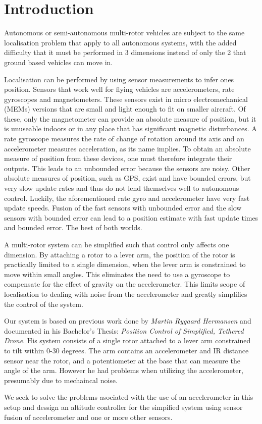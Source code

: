 \section*{Introduction}

Autonomous or semi-autonomous multi-rotor vehicles are subject to the 
same localisation problem that apply to all autonomous systems, with the added
difficulty that it must be performed in 3 dimensions instead of only 
the 2 that ground based vehicles can move in. 

Localisation can be performed by using sensor measurements to infer
ones position. Sensors that work well for flying vehicles are accelerometers,
rate gyroscopes and magnetometers. These sensors exist in micro electromechanical
(MEMs) versions that are small and light enough to fit on smaller aircraft.
Of these, only the magnetometer can provide
an absolute measure of position, but it is unuseable indoors or in any place
that has significant magnetic disturbances. A rate gyroscope measures the
rate of change of rotation around its axis and an accelerometer measures
acceleration, as its name implies. To obtain an absolute measure of position
from these devices, one must therefore integrate their outputs. This leads
to an unbounded error because the sensors are noisy. Other absolute measures 
of position, such as GPS, exist and have bounded errors, but very slow update
rates and thus do not lend themselves well to autonomous control. Luckily,
the aforementioned rate gyro and accelerometer have very fast update speeds.
Fusion of the fast sensors with unbounded error and the slow sensors with bounded
error can lead to a position estimate with fast update times and bounded error.
The best of both worlds.

A multi-rotor system can be simplified such that control only affects one dimension.
By attaching a rotor to a lever arm, the position of the rotor is practically limited
to a single dimension, when the lever arm is constrained to move within small angles.
This eliminates the need to use a gyroscope to compensate for the effect of gravity
on the accelerometer. This limits scope of localisation to dealing with noise
from the accelerometer and greatly simplifies the control of the system.

Our system is based on previous work done by \emph{Martin Rygaard Hermansen} and documented in his Bachelor's Thesis: \emph{Position Control of Simplified, Tethered Drone}. His system consists of a single rotor attached
to a lever arm constrained to tilt within 0-30 degrees. The arm contains an accelerometer
and IR distance sensor near the rotor, and a potentiometer at the base that can measure the angle of the arm. 
However he had problems when utilizing the accelerometer, presumably due to mechaincal noise.

We seek to solve the problems asociated with the use of an accelerometer in this setup and dessign an altitude controller for the simpified system using sensor fusion of accelerometer and one or more other sensors.